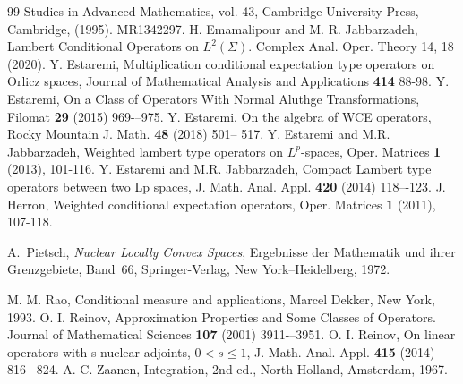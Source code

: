 \documentclass{amsart}
\theoremstyle{definition}\newtheorem{defn}[thm]{Definition}
\theoremstyle{remark}
\numberwithin{equation}{section}
\begin{document}
\begin{thebibliography}{99}
Studies in Advanced Mathematics, vol. 43, Cambridge University Press, Cambridge, (1995).
MR1342297.
 H. Emamalipour and M. R. Jabbarzadeh, Lambert Conditional Operators on $L^2(\Sigma)$. Complex Anal. Oper. Theory 14, 18 (2020).
 Y. Estaremi, Multiplication conditional expectation type operators on Orlicz spaces, Journal of Mathematical Analysis and Applications {\bf414} 88-98.
 Y. Estaremi, On a Class of Operators With Normal Aluthge Transformations, Filomat {\bf 29} (2015) 969-–975.
 Y. Estaremi, On the algebra of WCE operators, Rocky Mountain J. Math. {\bf 48} (2018) 501-- 517.
 Y. Estaremi and M.R. Jabbarzadeh, Weighted lambert type operators on
$L^{p}$-spaces, Oper. Matrices {\bf 1} (2013), 101-116.
 Y. Estaremi and M.R. Jabbarzadeh, Compact Lambert type operators between two Lp spaces, J. Math. Anal. Appl. {\bf 420} (2014) 118–-123.
J. Herron, Weighted conditional expectation operators, Oper.
Matrices {\bf 1} (2011), 107-118.
%
%

A.~Pietsch,
\emph{Nuclear Locally Convex Spaces},
Ergebnisse der Mathematik und ihrer Grenzgebiete, Band~66,
Springer-Verlag, New York--Heidelberg, 1972.

M. M. Rao, Conditional measure and applications, Marcel Dekker,
New York, 1993.
O. I. Reinov, Approximation Properties and Some Classes of Operators. Journal of Mathematical Sciences {\bf 107} (2001) 3911-–3951.
O. I. Reinov, On linear operators with s-nuclear adjoints, $0<s\leq1$, J. Math. Anal. Appl. {\bf 415} (2014) 816-–824.
A. C. Zaanen, Integration, 2nd ed., North-Holland, Amsterdam,
1967.

\end{thebibliography}
\end{document}
